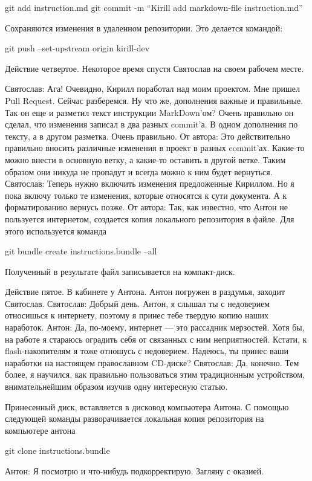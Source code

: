 git add instruction.md
git commit -m ``Kirill add markdown-file instruction.md''

Сохраняются изменения в удаленном репозитории. Это делается командой:

git push --set-upstream origin kirill-dev

Действие четвертое.
Некоторое время спустя Святослав на своем рабочем месте.

Святослав: Ага! Очевидно, Кирилл поработал над моим проектом. Мне пришел  Pull Request.
Сейчас разберемся. Ну что же, дополнения важные и правильные. Так он еще и разметил текст
инструкции MarkDown'ом? Очень правильно он сделал, что изменения записал в два разных commit'а.
В одном дополнения по тексту, а в другом разметка. Очень правильно.
От автора: Это действительно правильно вносить различные изменения в проект в разных commit'ах.
Какие-то можно внести в основную ветку, а какие-то оставить в другой ветке. Таким образом они
никуда не пропадут и всегда можно к ним будет вернуться. 
Святослав: Теперь нужно включить изменения предложенные Кириллом. Но я пока включу только те 
изменения, которые относятся к сути документа. А к форматированию вернусь позже.
От автора:
Так, как известно, что Антон не пользуется интернетом, создается копия локального 
репозитория в файле. Для этого используется команда

git bundle create instructions.bundle --all

Полученный в результате файл записывается на компакт-диск.

Действие пятое. 
В кабинете у Антона. Антон погружен в раздумья, заходит Святослав.
Святослав: Добрый день. Антон, я слышал ты с недоверием относишься к интернету, поэтому я принес
тебе твердую копию наших наработок. 
Антон: Да, по-моему, интернет --- это рассадник мерзостей. Хотя бы, на работе я стараюсь оградить себя от 
связанных с ним неприятностей. Кстати, к flash-накопителям я тоже отношусь с недоверием. Надеюсь, 
ты принес ваши наработки на настоящем православном CD-диске? 
Святослав: Да, конечно. Тем более, я научился, как правильно пользоваться
этим традиционным устройством, внимательнейшим образом изучив одну интересную статью.

Принесенный диск, вставляется в дисковод компьютера Антона. С помощью следующей команды разворачивается
локальная копия репозитория на компьютере антона

git clone instructions.bundle

Антон: Я посмотрю и что-нибудь подкорректирую. Загляну с оказией.
